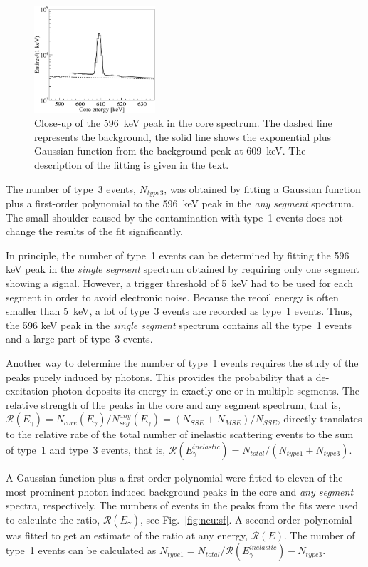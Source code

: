 \begin{figure}
\centering
\includegraphics[width=0.4\textwidth]{fit596}
\caption{Close-up of the 596~keV peak in the core spectrum. The dashed
line represents the background, the solid line shows the exponential
plus Gaussian function from the background peak at 609~keV. The
description of the fitting is given in the text.}
\label{fig:neu:f596}
\end{figure}

The number of type~3 events, $N_{type3}$, was obtained by fitting a
Gaussian function plus a first-order polynomial to the 596~keV peak in
the \emph{any segment} spectrum. The small shoulder caused by the
contamination with type~1 events does not change the results of the
fit significantly.

In principle, the number of type~1 events can be determined by fitting
the 596 keV peak in the \emph{single segment} spectrum obtained by
requiring only one segment showing a signal. However, a trigger
threshold of 5~keV had to be used for each segment in order to avoid
electronic noise. Because the recoil energy is often smaller than
5~keV, a lot of type~3 events are recorded as type~1 events. Thus, the
596 keV peak in the \emph{single segment} spectrum contains all the
type~1 events and a large part of type~3 events.

Another way to determine the number of type~1 events requires the
study of the peaks purely induced by photons. This provides the
probability that a de-excitation photon deposits its energy in exactly
one or in multiple segments. The relative strength of the peaks in the
core and any segment spectrum, that is, $\mathcal{R}(E_{\gamma}) =
N_{core}(E_{\gamma}) / N^{any}_{seg}(E_{\gamma}) = (N_{SSE} + N_{MSE})
/ N_{SSE}$, directly translates to the relative rate of the total
number of inelastic scattering events to the sum of type~1 and type~3
events, that is, $\mathcal{R}(E_{\gamma}^{inelastic}) = N_{total} /
(N_{type1} + N_{type3})$.

A Gaussian function plus a first-order polynomial were fitted to
eleven of the most prominent photon induced background peaks in the
core and \emph{any segment} spectra, respectively. The numbers of
events in the peaks from the fits were used to calculate the ratio,
$\mathcal{R}(E_{\gamma})$, see Fig.~\ref{fig:neu:sf}. A second-order
polynomial was fitted to get an estimate of the ratio at any energy,
$\mathcal{R}(E)$. The number of type~1 events can be calculated as
$N_{type1} = N_{total} / \mathcal{R}(E_{\gamma}^{inelastic}) -
N_{type3}$.

